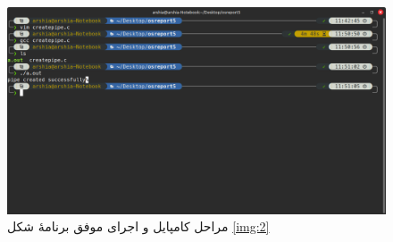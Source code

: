 \documentclass[12pt]{article}
\begin{document}
	\begin{figure}[H]
		\centering
		\includegraphics[width=\textwidth]{report5-resources/3.png}
		\caption{مراحل کامپایل و اجرای موفق برنامهٔ شکل \ref{img:2}}
		\label{img:3}
	\end{figure}
	
\end{document}
